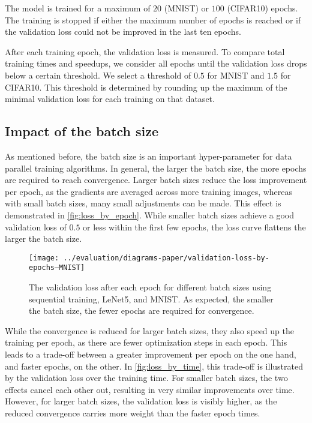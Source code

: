 \documentclass[conference]{IEEEtran}
\begin{document}
The model is trained for a maximum of $20$ (MNIST) or $100$ (CIFAR10) epochs.
The training is stopped if either the maximum number of epochs is reached or if the validation loss could not be improved in the last ten epochs.

After each training epoch, the validation loss is measured.
To compare total training times and speedups, we consider all epochs until the validation loss drops below a certain threshold.
We select a threshold of $0.5$ for MNIST and $1.5$ for CIFAR10.
This threshold is determined by rounding up the maximum of the minimal validation loss for each training on that dataset.


\subsection{Impact of the batch size} %
\label{sub:impact_of_the_batch_size}
As mentioned before, the batch size is an important hyper-parameter for data parallel training algorithms.
In general, the larger the batch size, the more epochs are required to reach convergence.
Larger batch sizes reduce the loss improvement per epoch, as the gradients are averaged across more training images, whereas with small batch sizes, many small adjustments can be made.
%
This effect is demonstrated in \autoref{fig:loss_by_epoch}.
While smaller batch sizes achieve a good validation loss of $0.5$ or less within the first few epochs, the loss curve flattens the larger the batch size.

\begin{figure}[ht]
\centering
\texttt{[image: ../evaluation/diagrams-paper/validation-loss-by-epochs--MNIST]}
\caption{The validation loss after each epoch for different batch sizes using sequential training, LeNet5, and MNIST.
As expected, the smaller the batch size, the fewer epochs are required for convergence.}
\label{fig:loss_by_epoch}
\end{figure}

While the convergence is reduced for larger batch sizes, they also speed up the training per epoch, as there are fewer optimization steps in each epoch.
This leads to a trade-off between a greater improvement per epoch on the one hand, and faster epochs, on the other.
In \autoref{fig:loss_by_time}, this trade-off is illustrated by the validation loss over the training time.
For smaller batch sizes, the two effects cancel each other out, resulting in very similar improvements over time.
However, for larger batch sizes, the validation loss is visibly higher, as the reduced convergence carries more weight than the faster epoch times.
\end{document}
